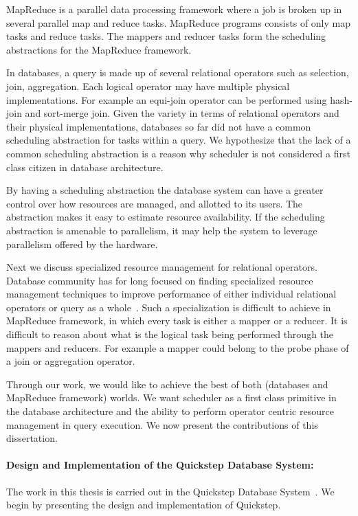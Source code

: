 MapReduce is a parallel data processing framework where a job is broken up in several parallel map and reduce tasks. 
MapReduce programs consists of only map tasks and reduce tasks.
The mappers and reducer tasks form the scheduling abstractions for the MapReduce framework.

In databases, a query is made up of several relational operators such as selection, join, aggregation. 
Each logical operator may have multiple physical implementations. 
For example an equi-join operator can be performed using hash-join and sort-merge join.
Given the variety in terms of relational operators and their physical implementations, databases so far did not have a common scheduling abstraction for tasks within a query. 
We hypothesize that the lack of a common scheduling abstraction is a reason why scheduler is not considered a first class citizen in database architecture.

By having a scheduling abstraction the database system can have a greater control over how resources are managed, and allotted to its users.
The abstraction makes it easy to estimate resource availability.
If the scheduling abstraction is amenable to parallelism, it may help the system to leverage parallelism offered by the hardware. 

Next we discuss specialized resource management for relational operators. 
Database community has for long focused on finding specialized resource management techniques to improve performance of either individual relational operators or query as a whole~\cite{davison1995dynamic, Bouganim:1998:MSL:288627.288646, memory-hash-ibm, mehta1993dynamic, DBLP:conf/cikm/NagD98}.
Such a specialization is difficult to achieve in MapReduce framework, in which every task is either a mapper or a reducer.
It is difficult to reason about what is the logical task being performed through the mappers and reducers. 
For example a mapper could belong to the probe phase of a join or aggregation operator. 

Through our work, we would like to achieve the best of both (databases and MapReduce framework) worlds.
We want scheduler as a first class primitive in the database architecture and the ability to perform operator centric resource management in query execution. 
We now present the contributions of this dissertation. 

\paragraph{Design and Implementation of the Quickstep Database System:}
The work in this thesis is carried out in the Quickstep Database System~\cite{quickstep-vldb, patel1quickstep, Quickstep-website}.
We begin by presenting the design and implementation of Quickstep.

